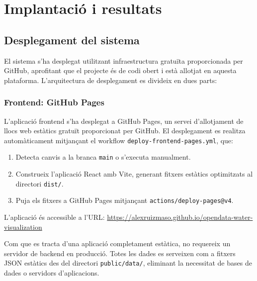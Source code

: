

\chapter{Implantació i resultats}
\label{Ch:Deployment}


\section{Desplegament del sistema}

El sistema s'ha desplegat utilitzant infraestructura gratuïta proporcionada per GitHub, aprofitant que el projecte és de codi obert i està allotjat en aquesta plataforma. L'arquitectura de desplegament es divideix en dues parts:

\subsection{Frontend: GitHub Pages}

L'aplicació frontend s'ha desplegat a GitHub Pages, un servei d'allotjament de llocs web estàtics gratuït proporcionat per GitHub. El desplegament es realitza automàticament mitjançant el workflow \texttt{deploy-frontend-pages.yml}, que:

\begin{enumerate}
    \item Detecta canvis a la branca \texttt{main} o s'executa manualment.
    \item Construeix l'aplicació React amb Vite, generant fitxers estàtics optimitzats al directori \texttt{dist/}.
    \item Puja els fitxers a GitHub Pages mitjançant \texttt{actions/deploy-pages@v4}.
\end{enumerate}

L'aplicació és accessible a l'URL: \url{https://alexruizmaso.github.io/opendata-water-visualization}

Com que es tracta d'una aplicació completament estàtica, no requereix un servidor de backend en producció. Totes les dades es serveixen com a fitxers JSON estàtics des del directori \texttt{public/data/}, eliminant la necessitat de bases de dades o servidors d'aplicacions.


